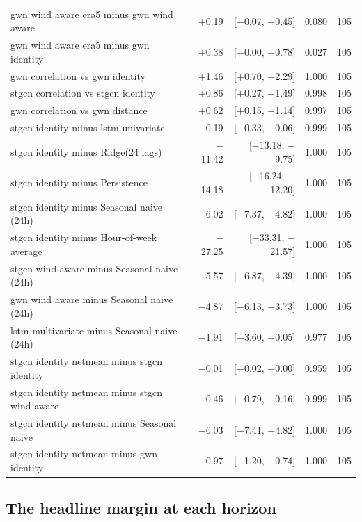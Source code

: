 \documentclass[11pt,a4paper]{article}
\begin{document}
\begin{table}[htbp]
{\begin{tabular}{lrrrr}
gwn wind aware era5 minus gwn wind aware       & $+$0.19 & [$-$0.07, $+$0.45] & 0.080 & 105 \\
gwn wind aware era5 minus gwn identity         & $+$0.38 & [$-$0.00, $+$0.78] & 0.027 & 105 \\
gwn correlation vs gwn identity            & $+$1.46 & [$+$0.70, $+$2.29] & 1.000 & 105 \\
stgcn correlation vs stgcn identity        & $+$0.86 & [$+$0.27, $+$1.49] & 0.998 & 105 \\
gwn correlation vs gwn distance            & $+$0.62 & [$+$0.15, $+$1.14] & 0.997 & 105 \\
stgcn identity minus lstm univariate           & $-$0.19 & [$-$0.33, $-$0.06] & 0.999 & 105 \\
stgcn identity minus Ridge(24 lags)            & $-$11.42 & [$-$13.18, $-$9.75] & 1.000 & 105 \\
stgcn identity minus Persistence               & $-$14.18 & [$-$16.24, $-$12.20] & 1.000 & 105 \\
stgcn identity minus Seasonal naive (24h)      & $-$6.02 & [$-$7.37, $-$4.82] & 1.000 & 105 \\
stgcn identity minus Hour-of-week average      & $-$27.25 & [$-$33.31, $-$21.57] & 1.000 & 105 \\
stgcn wind aware minus Seasonal naive (24h)    & $-$5.57 & [$-$6.87, $-$4.39] & 1.000 & 105 \\
gwn wind aware minus Seasonal naive (24h)      & $-$4.87 & [$-$6.13, $-$3.73] & 1.000 & 105 \\
lstm multivariate minus Seasonal naive (24h)   & $-$1.91 & [$-$3.60, $-$0.05] & 0.977 & 105 \\
stgcn identity netmean minus stgcn identity    & $-$0.01 & [$-$0.02, $+$0.00] & 0.959 & 105 \\
stgcn identity netmean minus stgcn wind aware  & $-$0.46 & [$-$0.79, $-$0.16] & 0.999 & 105 \\
stgcn identity netmean minus Seasonal naive    & $-$6.03 & [$-$7.41, $-$4.82] & 1.000 & 105 \\
stgcn identity netmean minus gwn identity      & $-$0.97 & [$-$1.20, $-$0.74] & 1.000 & 105 \\
\bottomrule
\end{tabular}%
}
\end{table}

\subsection{The headline margin at each horizon}
\end{document}
